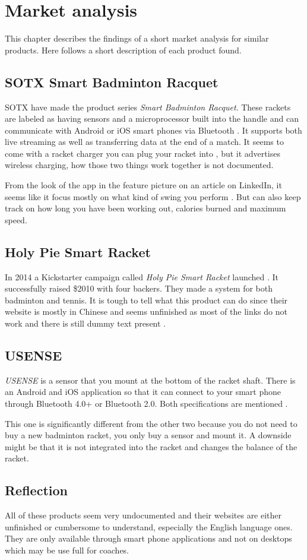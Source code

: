 \chapter{Market analysis}
This chapter describes the findings of a short market analysis for similar products. 
Here follows a short description of each product found.

\section*{SOTX Smart Badminton Racquet}
SOTX have made the product series \textit{Smart Badminton Racquet}. 
These rackets are labeled as having sensors and a microprocessor built into the handle and can communicate with Android or iOS smart phones via Bluetooth  \citep{marketAnalysis:sotxsite}. 
It supports both live streaming as well as transferring data at the end of a match. 
It seems to come with a racket charger you can plug your racket into \citep{marketAnalysis:sotxhw}, but it advertises wireless charging, how those two things work together is not documented.

From the look of the app in the feature picture on an article on LinkedIn, it seems like it focus mostly on what kind of swing you perform \citep{marketAnalysis:sotxapp}. 
But can also keep track on how long you have been working out, calories burned and maximum speed.

\section*{Holy Pie Smart Racket}
In 2014 a Kickstarter campaign called \textit{Holy Pie Smart Racket} launched \citep{marketAnalysis:holypie}. 
It successfully raised \$2010 with four backers. 
They made a system for both badminton and tennis. 
It is tough to tell what this product can do since their website is mostly in Chinese and seems unfinished as most of the links do not work and there is still dummy text present \citep{marketAnalysis:holypi}.

\section*{USENSE}
\textit{USENSE} is a sensor that you mount at the bottom of the racket shaft. 
There is an Android and iOS application so that it can connect to your smart phone through Bluetooth 4.0+ or Bluetooth 2.0. 
Both specifications are mentioned \citep{marketAnalysis:usense}.
 
This one is significantly different from the other two because you do not need to buy a new badminton racket, you only buy a sensor and mount it. 
A downside might be that it is not integrated into the racket and changes the balance of the racket.	

\section*{Reflection}
All of these products seem very undocumented and their websites are either unfinished or cumbersome to understand, especially the English language ones. 
They are only available through smart phone applications and not on desktops which may be use full for coaches.
